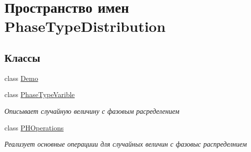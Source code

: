 \hypertarget{namespace_phase_type_distribution}{}\section{Пространство имен Phase\+Type\+Distribution}
\label{namespace_phase_type_distribution}
\subsection*{Классы}
\begin{DoxyCompactItemize}
\item 
class \hyperlink{class_phase_type_distribution_1_1_demo}{Demo}
\item 
class \hyperlink{class_phase_type_distribution_1_1_phase_type_varible}{Phase\+Type\+Varible}
\begin{DoxyCompactList}\small\item\em Описывает случайную величину с фазовым расределением \end{DoxyCompactList}\item 
class \hyperlink{class_phase_type_distribution_1_1_p_h_operations}{P\+H\+Operations}
\begin{DoxyCompactList}\small\item\em Реализует основные операциии для случайных величин с фазовыс распределнием \end{DoxyCompactList}\end{DoxyCompactItemize}
